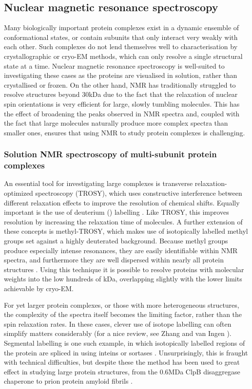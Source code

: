 \documentclass[a4paper,11pt,twoside,openright]{scrbook}
\begin{document}
\subsection{Nuclear magnetic resonance spectroscopy}
Many biologically important protein complexes exist in a dynamic ensemble of conformational states, or contain subunits that only interact very weakly with each other. Such complexes do not lend themselves well to characterisation by crystallographic or cryo-EM methods, which can only resolve a single structural state at a time. Nuclear magnetic resonance spectroscopy is well-suited to investigating these cases as the proteins are visualised in solution, rather than crystallised or frozen. On the other hand, NMR has traditionally struggled to resolve structures beyond 30kDa due to the fact that the relaxation of nuclear spin orientations is very efficient for large, slowly tumbling molecules. This has the effect of broadening the peaks observed in NMR spectra and, coupled with the fact that large molecules naturally produce more complex spectra than smaller ones, ensures that using NMR to study protein complexes is challenging.

\subsubsection{Solution NMR spectroscopy of multi-subunit protein complexes}
An essential tool for investigating large complexes is transverse relaxation-optimized spectroscopy \cite{Pervushin1997} (TROSY), which uses constructive interference between different relaxation effects to improve the resolution of chemical shifts. Equally important is the use of deuterium () labelling \cite{Sattler1996}. Like TROSY, this improves resolution by increasing the relaxation time of molecules. A further extension of these concepts is methyl-TROSY, which makes use of isotopically labelled  methyl groups set against a highly deuterated background. Because methyl groups produce especially intense resonances, they are easily identifiable within NMR spectra, and furthermore they are well dispersed within nearly all protein structures \cite{Ollerenshaw2003}. Using this technique it is possible to resolve proteins with molecular weights into the low hundreds of kDa, overlapping slightly with the lower limits achievable by cryo-EM.

For yet larger protein complexes, or those with more heterogeneous structures, the complexity of the spectra itself becomes the limiting factor, rather than the spin relaxation rates. In these cases, clever use of isotope labelling can often simplify matters considerably (for a nice review, see Zhang and van Ingen \cite{Zhang2016}). Segmental labelling is one such example, in which isotopically labelled regions of the protein are spliced in using inteins or sortases \cite{Liu2009a}. Unsurprisingly, this is fraught with technical difficulties, but despite these the method has been used to great effect in studying large protein structures, from the 0.6MDa ClpB disaggregase chaperone \cite{Rosenzweig2015} to prion protein amyloid fibrils \cite{Frederick2017}.
\end{document}
